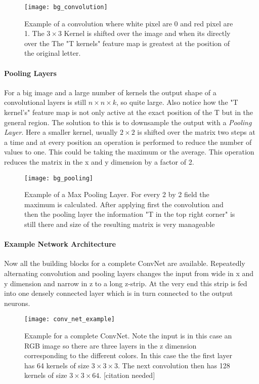 \begin{figure}[H]
    \centering
    \texttt{[image: bg\_convolution]}
    \caption{Example of a convolution where white pixel are 0 and red pixel are 1. The $3 \times 3$ Kernel is shifted over the image and when its directly over the  The "T kernels" feature map is greatest at the position of the original letter. }
    \label{fig:bg:convolution}
\end{figure}

\paragraph{Pooling Layers}
For a big image and a large number of kernels the output shape of a convolutional layers is still $n \times n \times k$, so quite large. Also notice how the "T kernel's" feature map is not only active at the exact position of the T but in the general region. The solution to this is to downsample the output with a \textit{Pooling Layer}. Here a smaller kernel, usually $2 \times 2$ is shifted over the matrix two steps at a time and at every position an operation is performed to reduce the number of values to one. This could be taking the maximum or the average. This operation reduces the matrix in the x and y dimension by a factor of 2.

\begin{figure}[H]
    \centering
    \texttt{[image: bg\_pooling]}
    \caption{Example of a Max Pooling Layer. For every 2 by 2 field the maximum is calculated. After applying first the convolution and then the pooling layer the information "T in the top right corner" is still there and size of the resulting matrix is very manageable}
    \label{fig:bg:pooling}
\end{figure}

\paragraph{Example Network Architecture}
Now all the building blocks for a complete ConvNet are available. Repeatedly alternating convolution and pooling layers changes the input from wide in x and y dimension and narrow in z to a long z-strip. At the very end this strip is fed into one densely connected layer which is in turn connected to the output neurons.

\begin{figure}[H]
    \centering
    \texttt{[image: conv\_net\_example]}
    \caption{Example for a complete ConvNet. Note the input is in this case an RGB image so there are three layers in the z dimension corresponding to the different colors. In this case the the first layer has 64 kernels of size $3 \times 3 \times 3$. The next convolution then has 128 kernels of size $3 \times 3 \times 64$. [citation needed]}
    \label{fig:bg:NN_example}
\end{figure}

